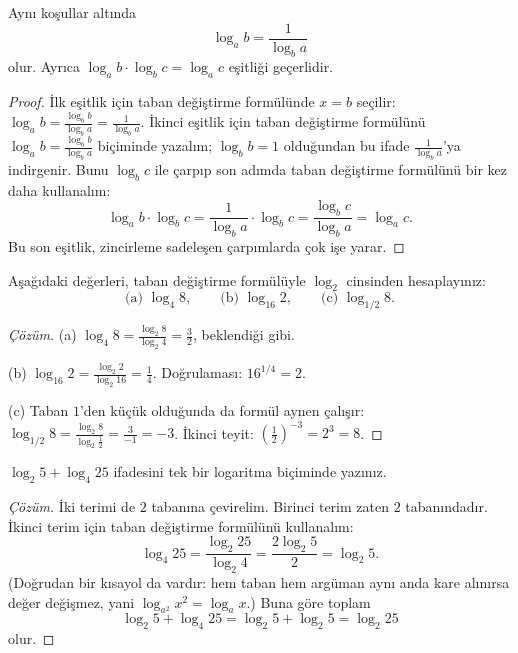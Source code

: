 \begin{corollary}\label{cor:log-ters}
Aynı koşullar altında
\[
\log_a b = \frac{1}{\log_b a}
\]
olur. Ayrıca $\log_a b \cdot \log_b c = \log_a c$ eşitliği geçerlidir.
\end{corollary}

\begin{proof}
İlk eşitlik için taban değiştirme formülünde $x = b$ seçilir: $\log_a b = \frac{\log_b b}{\log_b a} = \frac{1}{\log_b a}$. İkinci eşitlik için taban değiştirme formülünü $\log_a b = \frac{\log_b b}{\log_b a}$ biçiminde yazalım; $\log_b b = 1$ olduğundan bu ifade $\frac{1}{\log_b a}$'ya indirgenir. Bunu $\log_b c$ ile çarpıp son adımda taban değiştirme formülünü bir kez daha kullanalım:
\[
\log_a b \cdot \log_b c = \frac{1}{\log_b a} \cdot \log_b c = \frac{\log_b c}{\log_b a} = \log_a c.
\]
Bu son eşitlik, zincirleme sadeleşen çarpımlarda çok işe yarar.
\end{proof}

\begin{example}
Aşağıdaki değerleri, taban değiştirme formülüyle $\log_2$ cinsinden hesaplayınız:
\[
\text{(a) } \log_4 8, \qquad \text{(b) } \log_{16} 2, \qquad \text{(c) } \log_{1/2} 8.
\]
\end{example}

\begin{proof}[Çözüm]
(a) $\log_4 8 = \frac{\log_2 8}{\log_2 4} = \frac{3}{2}$, beklendiği gibi.

(b) $\log_{16} 2 = \frac{\log_2 2}{\log_2 16} = \frac{1}{4}$. Doğrulaması: $16^{1/4} = 2$.

(c) Taban $1$'den küçük olduğunda da formül aynen çalışır: $\log_{1/2} 8 = \frac{\log_2 8}{\log_2 \frac{1}{2}} = \frac{3}{-1} = -3$. İkinci teyit: $\left(\frac{1}{2}\right)^{-3} = 2^3 = 8$.
\end{proof}

\begin{example}
$\log_2 5 + \log_4 25$ ifadesini tek bir logaritma biçiminde yazınız.
\end{example}

\begin{proof}[Çözüm]
İki terimi de $2$ tabanına çevirelim. Birinci terim zaten $2$ tabanındadır. İkinci terim için taban değiştirme formülünü kullanalım:
\[
\log_4 25 = \frac{\log_2 25}{\log_2 4} = \frac{2\log_2 5}{2} = \log_2 5.
\]
(Doğrudan bir kısayol da vardır: hem taban hem argüman aynı anda kare alınırsa değer değişmez, yani $\log_{a^2} x^2 = \log_a x$.) Buna göre toplam
\[
\log_2 5 + \log_4 25 = \log_2 5 + \log_2 5 = \log_2 25
\]
olur.
\end{proof}

